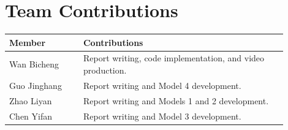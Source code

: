 \documentclass[11pt,a4paper]{article}
\begin{document}
\section{Team Contributions}
\begin{table}[htbp]\centering\small
\begin{tabular}{p{0.24\linewidth}p{0.66\linewidth}}\toprule
Member & Contributions\\\midrule
Wan Bicheng & Report writing, code implementation, and video production.\\
Guo Jinghang & Report writing and Model 4 development.\\
Zhao Liyan & Report writing and Models 1 and 2 development.\\
Chen Yifan & Report writing and Model 3 development.\\\bottomrule
\end{tabular}
\end{table}
\end{document}
